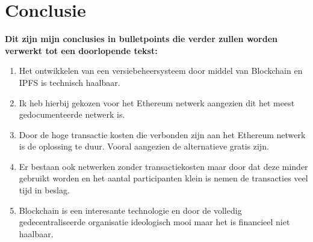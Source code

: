 
\chapter{Conclusie}
\label{ch:conclusie}

\textbf{Dit zijn mijn conclusies in bulletpoints die verder zullen worden verwerkt tot een doorlopende tekst:}
\begin{enumerate}
\item Het ontwikkelen van een versiebeheersysteem door middel van Blockchain en IPFS is technisch haalbaar. 
\item Ik heb hierbij gekozen voor het Ethereum netwerk aangezien dit het meest gedocumenteerde netwerk is.
\item Door de hoge transactie kosten die verbonden zijn aan het Ethereum netwerk is de oplossing te duur. Vooral aangezien de alternatieve gratis zijn.
\item Er bestaan ook netwerken zonder transactiekosten maar door dat deze minder gebruikt worden en het aantal participanten klein is nemen de transacties veel tijd in beslag.
\item Blockchain is een interesante technologie en door de volledig gedecentraliseerde organisatie ideologisch mooi maar het is financieel niet haalbaar.
\end{enumerate}

